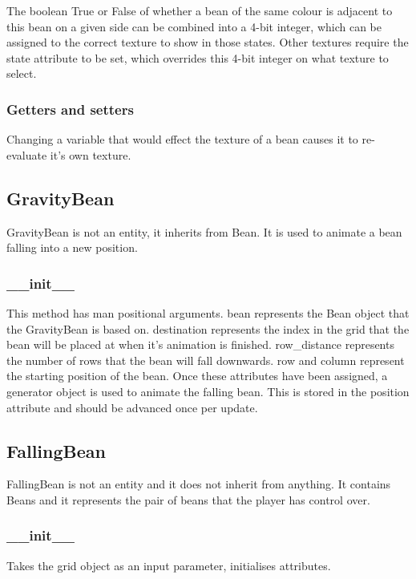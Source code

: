\documentclass{report}
\begin{document}
The boolean True or False of whether a bean of the same colour is adjacent to this bean on a given side can be combined into a 4-bit integer, which can be assigned to the correct texture to show in those states. Other textures require the state attribute to be set, which overrides this 4-bit integer on what texture to select.

\subsubsection{Getters and setters}

Changing a variable that would effect the texture of a bean causes it to re-evaluate it's own texture.

\subsection{GravityBean}

GravityBean is not an entity, it inherits from Bean. It is used to animate a bean falling into a new position.

\subsubsection{\_\_init\_\_}

This method has man positional arguments. bean represents the Bean object that the GravityBean is based on. destination represents the index in the grid that the bean will be placed at when it's animation is finished. row\_distance represents the number of rows that the bean will fall downwards. row and column represent the starting position of the bean.
Once these attributes have been assigned, a generator object is used to animate the falling bean. This is stored in the position attribute and should be advanced once per update.

\subsection{FallingBean}

FallingBean is not an entity and it does not inherit from anything. It contains Beans and it represents the pair of beans that the player has control over.

\subsubsection{\_\_init\_\_}

Takes the grid object as an input parameter, initialises attributes.
\end{document}

